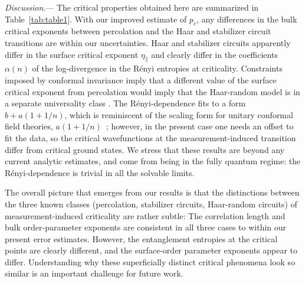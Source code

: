 \documentclass[prl,twocolumn,aps,showpacs,amsmath,amssymb,superscriptaddress,floatfix,longbibliography]{revtex4-1}
\begin{document}
\emph{Discussion}.---
The critical properties obtained here are summarized in Table~\ref{tab:table1}. With our improved estimate of $p_c$, any differences in the bulk critical exponents between percolation and the Haar and stabilizer circuit transitions are within our uncertainties.  Haar and stabilizer circuits apparently differ in the surface critical exponent $\eta_\parallel$ and clearly differ in the coefficients $\alpha(n)$ of the log-divergence in the R\'enyi entropies at criticality.
Constraints imposed by conformal invariance imply that a different value of the surface critical exponent from percolation would imply that the Haar-random model is in a separate universality class \cite{Cardy84}.  The R\'enyi-dependence fits to a form $b + a(1 + 1/n)$, which is reminiscent of the scaling form for unitary conformal field theories, $a(1+1/n)$~\cite{lefevre}; however, in the present case one needs an offset to fit the data, so the critical wavefunctions at the measurement-induced transition differ from critical ground states.  We stress that these results are beyond any current analytic estimates, and come from being in the fully quantum regime: the R\'enyi-dependence is trivial in all the solvable limits.

The overall picture that emerges from our results is that the distinctions between the three known classes (percolation, stabilizer circuits, Haar-random circuits) of measurement-induced criticality are rather subtle:  The correlation length and bulk order-parameter exponents are consistent in all three cases to within our present error estimates.  However, the entanglement entropies at the critical points are clearly different, and the surface-order parameter exponents appear to differ.  Understanding why these superficially distinct critical phenomena look so similar is an important challenge for future work.
\end{document}
